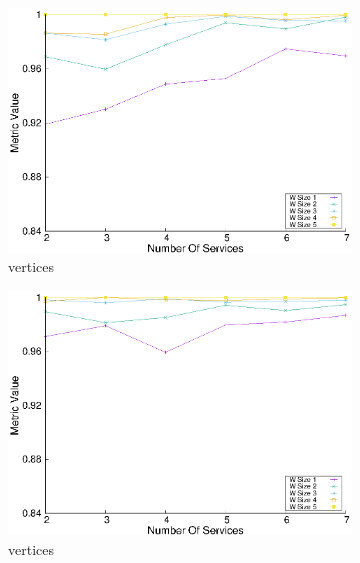 \begin{figure}[H]
\begin{subfigure}{0.45\textwidth}
    \includegraphics[width=\textwidth]{Images/graphs/window_quality_performance_diff_qual_n7_s7_20_100_n5}
    \caption{ vertices}
    \label{fig:quality_window_wide_qualitative_n5}
  \end{subfigure}
  \hfill
  \begin{subfigure}{0.45\textwidth}
    \includegraphics[width=\textwidth]{Images/graphs/window_quality_performance_diff_qual_n7_s7_50_80_n5}
    \caption{ vertices}
    \label{fig:quality_window_average_qualitative_n5}
  \end{subfigure}
  \begin{subfigure}{0.45\textwidth}

\end{subfigure}
\end{figure}
